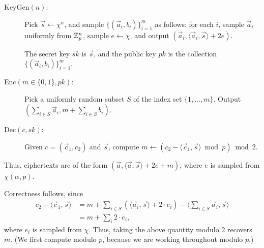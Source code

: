     \begin{description}
        \item[KeyGen$(n)$:] Pick $\vec{s} \leftarrow \chi^n$, and sample $\{(\vec{a}_i, b_i)\}_{i = 1}^m$ as follows: for each $i$, sample $\vec{a}_i$ uniformly from $\mathbb{Z}_p^n$, sample $e \leftarrow \chi$, and output $(\vec{a}_i, \langle \vec{a}_i, \vec{s} \rangle + 2e)$.

        The secret key $sk$ is $\vec{s}$, and the public key $pk$ is the collection $\{(\vec{a}_i, b_i)\}_{i = 1}^m$.

        \item[Enc$(m \in \{0, 1\}, pk)$:] Pick a uniformly random subset $S$ of the index set $\{1, \dots, m\}$. Output $(\sum_{i \in S} \vec{a}_i, m + \sum_{i \in S} b_i)$.

        \item[Dec$(c, sk)$:] Given $c = (\vec{c}_1, c_2)$ and $\vec{s}$, compute $m \leftarrow (c_2 - \langle \vec{c}_1 , \vec{s} \rangle \bmod p) \bmod 2$.
    \end{description}

    Thus, ciphertexts are of the form $(\vec{a}, \langle \vec{a}, \vec{s} \rangle + 2e + m)$, where $e$ is sampled from $\chi(\alpha, p)$.

    Correctness follows, since
    \begin{align*}
    c_2 - \langle \vec{c}_1, \vec{s} \rangle &= m + \sum_{i \in S} (\langle \vec{a}_i, \vec{s} \rangle + 2 \cdot e_i) - \langle \sum_{i \in S} \vec{a}_i, \vec{s} \rangle \\
    &= m + \sum_i 2 \cdot e_i,
    \end{align*}
    where $e_i$ is sampled from $\chi$. Thus, taking the above quantity modulo $2$ recovers $m$. (We first compute modulo $p$, because we are working throughout modulo $p$.)

